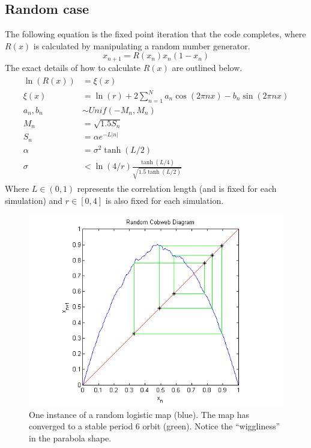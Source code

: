 \documentclass[12pt]{article}
\begin{document}
\subsection{Random case}
The following equation is the fixed point iteration that the code
completes, where $R(x)$ is calculated by manipulating a random number generator.
\begin{equation*}
x_{n+1} = R(x_n)x_n(1-x_n)
\end{equation*}
The exact details of how to calculate $R(x)$ are outlined below.
\begin{align}\label{randlog}
\begin{split}
\ln(R(x)) &= \xi(x)\\
\xi(x) &= \ln(r) + 2\sum^N_{n=1}a_n\cos(2\pi nx)-b_n\sin(2\pi nx)\\
a_n,b_n &\sim Unif(-M_n,M_n)\\
M_n &= \sqrt{1.5S_n}\\
S_n &= \alpha e^{-L|n|}\\
\alpha &= \sigma^2 \tanh(L/2)\\
\sigma &< \ln(4/r)\frac{\tanh(L/4)}{\sqrt{1.5\tanh(L/2)}}
\end{split}
\end{align}
Where $L \in (0,1)$ represents the correlation length (and is fixed
for each simulation) and $r \in [0,4]$ is also fixed for each
simulation. 
\begin{figure}[H]
	\begin{center}
		\includegraphics[scale=0.7]{rand_cobweb}
\caption{One instance of a random logistic map (blue). The map has
  converged to a stable period 6 orbit (green). Notice the
  ``wiggliness'' in the parabola shape.}
	\end{center}
\end{figure}
\end{document}
